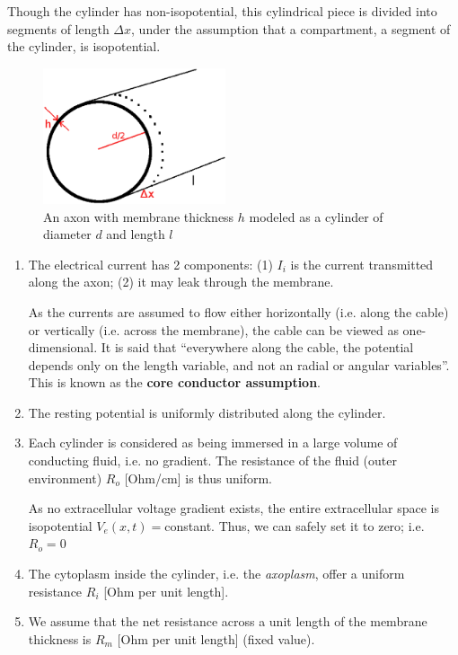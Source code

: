 Though the cylinder has non-isopotential, this cylindrical piece is divided into
segments of length $\Delta x$, under the assumption that a compartment, a
segment of the cylinder, is isopotential.

\begin{figure}[htb]
\centerline{\includegraphics[height=4cm]{./images/membrane-cylinder.eps}}
\caption{An axon with membrane thickness $h$ modeled as a
cylinder of diameter $d$ and length $l$}\label{fig:membrane-cylinder}
\end{figure} 

\begin{enumerate}
  \item The electrical current has 2 components:
  (1) $I_i$ is the current transmitted  along the axon; (2) it may leak through the
  membrane.
  
  As the currents are assumed to flow either horizontally (i.e. along the
cable) or vertically (i.e. across the membrane), the cable can be viewed
as one-dimensional. It is said that ``everywhere along the cable, the potential
depends only on the length variable, and not an radial or angular variables''.
This is known as the {\bf core conductor assumption}.

  \item The resting potential is uniformly distributed along the cylinder.
  
  \item Each cylinder is considered as being immersed in a large volume of
  conducting fluid, i.e. no gradient. The resistance of the fluid (outer
  environment) $R_o$ [Ohm/cm] is thus uniform.
  
  As no extracellular voltage gradient exists, the entire extracellular
  space is isopotential $V_e(x,t) = $constant. Thus, we can safely set it to
  zero; i.e. $R_o = 0$
  
  \item The cytoplasm inside the cylinder, i.e. the {\it axoplasm},
offer a uniform resistance $R_i$ [Ohm per unit length].

  \item We assume that the net resistance across a unit
  length of the membrane thickness is $R_m$ [Ohm per unit length] (fixed value).
\end{enumerate}

